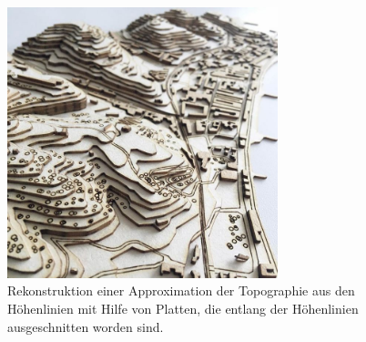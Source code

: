 %
%
%
\begin{figure}
\centering
\includegraphics[width=0.7\textwidth]{chapters/120-topologie/images/relief.jpg}
\caption{Rekonstruktion einer Approximation der Topographie aus den
%
Höhenlinien mit Hilfe von Platten, die entlang der Höhenlinien ausgeschnitten
worden sind.
\label{buch:topologie:morse:fig:relief}}
\end{figure}
